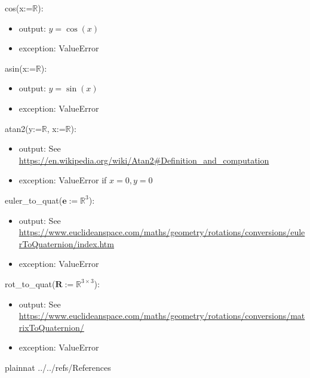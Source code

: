 \documentclass[12pt, titlepage]{article}
\begin{document}
\noindent cos(x:=$\mathbb{R}$):
\begin{itemize}
\item output: $y = \cos(x)$
\item exception: ValueError
\end{itemize}

\noindent asin(x:=$\mathbb{R}$):
\begin{itemize}
\item output: $y = \sin(x)$
\item exception: ValueError
\end{itemize}

\noindent atan2(y:=$\mathbb{R}$, x:=$\mathbb{R}$):
\begin{itemize}
\item output: See \url{https://en.wikipedia.org/wiki/Atan2#Definition_and_computation}
\item exception: ValueError if $x =0, y =0$
\end{itemize}

\noindent euler\_to\_quat($\mathbf{e}:=\mathbb{R}^3$):
\begin{itemize}
\item output: See
\url{https://www.euclideanspace.com/maths/geometry/rotations/conversions/eulerToQuaternion/index.htm}
\item exception: ValueError
\end{itemize}

\noindent rot\_to\_quat($\mathbf{R} := \mathbb{R}^{3 \times 3}$):
\begin{itemize}
\item output: See
\url{https://www.euclideanspace.com/maths/geometry/rotations/conversions/matrixToQuaternion/}
\item exception: ValueError
\end{itemize}

\newpage

 {plainnat}
 {../../refs/References}

\end{document}

